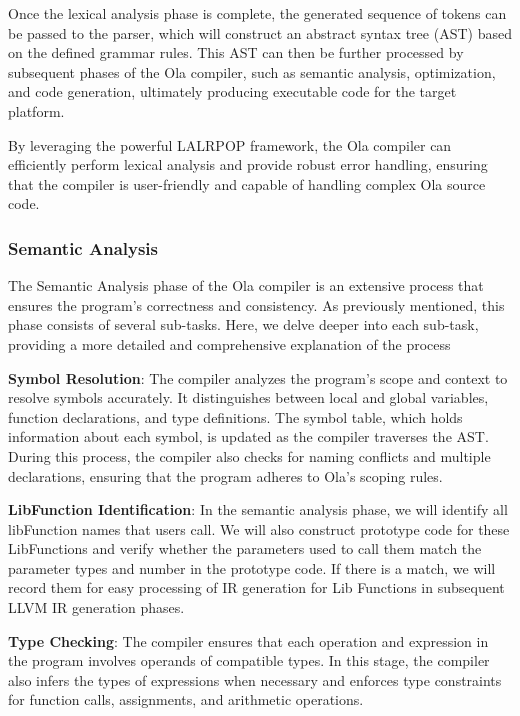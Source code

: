 Once the lexical analysis phase is complete, the generated sequence of tokens can be passed to the parser, which will construct an abstract syntax tree (AST) based on the defined grammar rules. This AST can then be further processed by subsequent phases of the Ola compiler, such as semantic analysis, optimization, and code generation, ultimately producing executable code for the target platform.

By leveraging the powerful LALRPOP framework, the Ola compiler can efficiently perform lexical analysis and provide robust error handling, ensuring that the compiler is user-friendly and capable of handling complex Ola source code.

\subsubsection{Semantic Analysis}

The Semantic Analysis phase of the Ola compiler is an extensive process that ensures the program's correctness and consistency. As previously mentioned, this phase consists of several sub-tasks. Here, we delve deeper into each sub-task, providing a more detailed and comprehensive explanation of the process

\textbf{Symbol Resolution}: The compiler analyzes the program's scope and context to resolve symbols accurately. It distinguishes between local and global variables, function declarations, and type definitions. The symbol table, which holds information about each symbol, is updated as the compiler traverses the AST. During this process, the compiler also checks for naming conflicts and multiple declarations, ensuring that the program adheres to Ola's scoping rules.

\textbf{LibFunction Identification}: In the semantic analysis phase, we will identify all libFunction names that users call. We will also construct prototype code for these LibFunctions and verify whether the parameters used to call them match the parameter types and number in the prototype code. If there is a match, we will record them for easy processing of IR generation for Lib Functions in subsequent LLVM IR generation phases.

\textbf{Type Checking}: The compiler ensures that each operation and expression in the program involves operands of compatible types. In this stage, the compiler also infers the types of expressions when necessary and enforces type constraints for function calls, assignments, and arithmetic operations.

